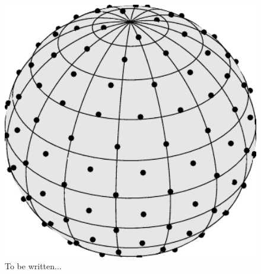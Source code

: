   
  
    
    
\begin{figure}[tb]
  \centering
  \includegraphics[width=12cm]{images/healpix}
  \caption{To be written...}
  \label{healpix}
\end{figure}


